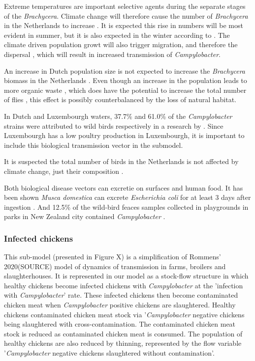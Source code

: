 Extreme temperatures are important selective agents during the separate stages of the \textit{Brachycera}. Climate change will therefore cause the number of \textit{Brachycera} in the Netherlands to increase \parencite{goulson_predicting_2005}. It is expected this rise in numbers will be most evident in summer, but it is also expected in the winter according to \citeauthor{goulson_predicting_2005}. The climate driven population growt will also trigger migration, and therefore the dispersal \parencite{feder_locomotion_2010}, which will result in increased transmission of \textit{Campylobacter}.

An increase in Dutch population size is not expected to increase the \textit{Brachycera} biomass in the Netherlands \parencite{guenat_effects_2019-1}. Even though an increase in the population leads to more organic waste \parencite{garcia-garcia_framework_2015}, which does have the potential to increase the total number of flies \parencite{imai_population_1984, rozendaal_houseflies_1997}, this effect is possibly counterbalanced by the loss of natural habitat.

In Dutch and Luxembourgh waters, 37.7\% and 61.0\% of the \textit{Campylobacter} strains were attributed to wild birds respectively in a research by \cite{mughini-gras_quantifying_2016}. Since Luxembourgh has a low poultry production in Luxembourgh, it is important to include this biological transmission vector in the submodel.

It is suspected the total number of birds in the Netherlands is not affected by climate change, just their composition \parencite{mclean_reduced_2020, knudsen_challenging_2011}.

Both biological disease vectors can excretie  on surfaces and human food. It has been shown \textit{Musca domestica} can excrete \textit{Escherichia coli} for at least 3 days after ingestion \parencite{sasaki_epidemiological_2000}. And  12.5\% of the wild-bird feaces samples collected in playgrounds in parks in New Zealand city contained \textit{Campylobacter} \parencite{french_molecular_2009}.

\subsubsection*{Infected chickens}
This sub-model (presented in Figure X) is a simplification of Rommens' 2020(SOURCE) model of dynamics of transmission in farms, broilers and slaughterhouses. It is represented in our model as a stock-flow structure in which healthy chickens become infected chickens with \textit{Campylobacter} at the 'infection with \textit{Campylobacter}' rate. These infected chickens then become contaminated chicken meat when \textit{Campylobacter} positive chickens are slaughtered. Healthy chickens  contaminated chicken meat stock via '\textit{Campylobacter} negative chickens being slaughtered with cross-contamination. The contaminated chicken meat stock is reduced as contaminated chicken meat is consumed. The population of healthy chickens are also reduced by thinning, represented by the flow variable '\textit{Campylobacter} negative chickens slaughtered without contamination'.

